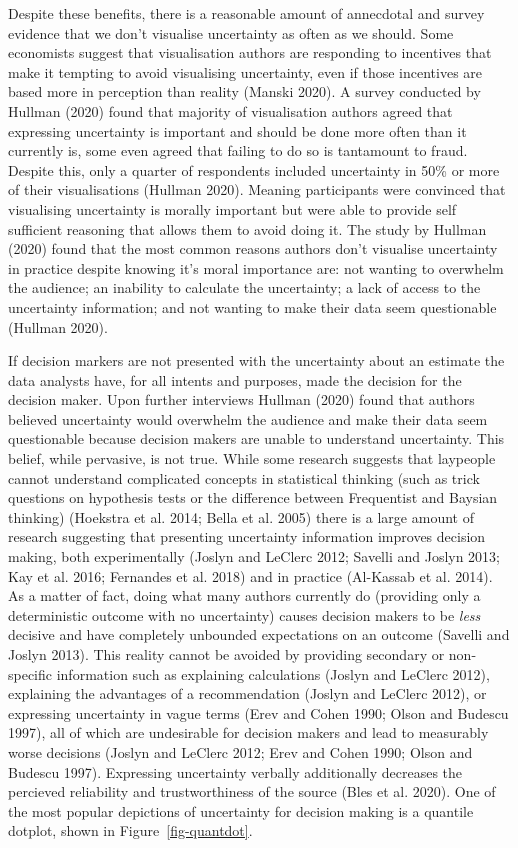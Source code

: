 \documentclass[
  letterpaper,
  DIV=11,
  numbers=noendperiod]{scrartcl}
\begin{document}
Despite these benefits, there is a reasonable amount of annecdotal and
survey evidence that we don't visualise uncertainty as often as we
should. Some economists suggest that visualisation authors are
responding to incentives that make it tempting to avoid visualising
uncertainty, even if those incentives are based more in perception than
reality (Manski 2020). A survey conducted by Hullman (2020) found that
majority of visualisation authors agreed that expressing uncertainty is
important and should be done more often than it currently is, some even
agreed that failing to do so is tantamount to fraud. Despite this, only
a quarter of respondents included uncertainty in 50\% or more of their
visualisations (Hullman 2020). Meaning participants were convinced that
visualising uncertainty is morally important but were able to provide
self sufficient reasoning that allows them to avoid doing it. The study
by Hullman (2020) found that the most common reasons authors don't
visualise uncertainty in practice despite knowing it's moral importance
are: not wanting to overwhelm the audience; an inability to calculate
the uncertainty; a lack of access to the uncertainty information; and
not wanting to make their data seem questionable (Hullman 2020).

If decision markers are not presented with the uncertainty about an
estimate the data analysts have, for all intents and purposes, made the
decision for the decision maker. Upon further interviews Hullman (2020)
found that authors believed uncertainty would overwhelm the audience and
make their data seem questionable because decision makers are unable to
understand uncertainty. This belief, while pervasive, is not true. While
some research suggests that laypeople cannot understand complicated
concepts in statistical thinking (such as trick questions on hypothesis
tests or the difference between Frequentist and Baysian thinking)
(Hoekstra et al. 2014; Bella et al. 2005) there is a large amount of
research suggesting that presenting uncertainty information improves
decision making, both experimentally (Joslyn and LeClerc 2012; Savelli
and Joslyn 2013; Kay et al. 2016; Fernandes et al. 2018) and in practice
(Al-Kassab et al. 2014). As a matter of fact, doing what many authors
currently do (providing only a deterministic outcome with no
uncertainty) causes decision makers to be \emph{less} decisive and have
completely unbounded expectations on an outcome (Savelli and Joslyn
2013). This reality cannot be avoided by providing secondary or
non-specific information such as explaining calculations (Joslyn and
LeClerc 2012), explaining the advantages of a recommendation (Joslyn and
LeClerc 2012), or expressing uncertainty in vague terms (Erev and Cohen
1990; Olson and Budescu 1997), all of which are undesirable for decision
makers and lead to measurably worse decisions (Joslyn and LeClerc 2012;
Erev and Cohen 1990; Olson and Budescu 1997). Expressing uncertainty
verbally additionally decreases the percieved reliability and
trustworthiness of the source (Bles et al. 2020). One of the most
popular depictions of uncertainty for decision making is a quantile
dotplot, shown in Figure~\ref{fig-quantdot}.
\end{document}
